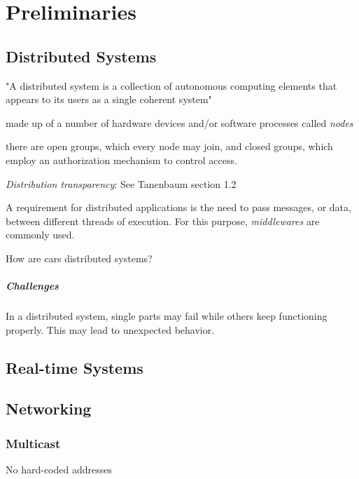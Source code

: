 

\chapter{Preliminaries}\label{chapter:preliminaries}


\section{Distributed Systems}

"A distributed system is a collection of autonomous computing elements that appears to its users as a single coherent system" \cite{tanenbaum2017distributed}

made up of a number of hardware devices and/or software processes called \emph{nodes}

there are open groups, which every node may join, and closed groups, which employ an authorization mechanism to control access.

\emph{Distribution transparency}: See Tanenbaum section 1.2

A requirement for distributed applications is the need to pass messages, or data, between different threads of execution. For this purpose, \emph{middlewares} \cite{bernstein1996middleware} are commonly used. 


How are cars distributed systems?

\paragraph{Challenges} In a distributed system, single parts may fail while others keep functioning properly.  This may lead to unexpected behavior.


\section{Real-time Systems}




\section{Networking}

\subsection{Multicast}

No hard-coded addresses


